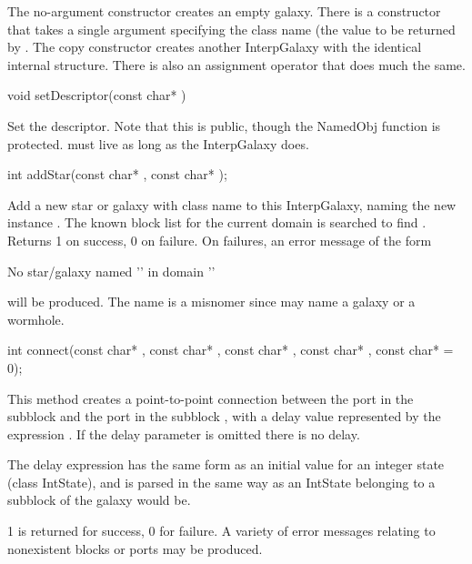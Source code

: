 The no-argument constructor creates an empty galaxy.  There is a
constructor that takes a single  argument
specifying the class name (the value to be returned by .
The copy constructor creates another InterpGalaxy with the identical
internal structure.  There is also an assignment operator that does
much the same.

\begin{example}
void setDescriptor(const char* )
\end{example}

Set the descriptor.  Note that this is public, though the NamedObj
function is protected.  must live as long as the InterpGalaxy
does.

\begin{example}
int addStar(const char* , const char* );
\end{example}

Add a new star or galaxy with class name  to this
InterpGalaxy, naming the new instance .  The known block
list for the current domain is searched to find .
Returns 1 on success, 0 on failure.  On failures, an error message
of the form

\begin{example}
No star/galaxy named '' in domain ''
\end{example}

will be produced.  The name is a misnomer since  may
name a galaxy or a wormhole.

\begin{example}
int connect(const char* , const char* ,
            const char* , const char* ,
            const char*  = 0);
\end{example}

This method creates a point-to-point connection between the port
 in the subblock  and the port 
in the subblock , with a delay value represented by
the expression .
If the delay parameter is omitted there is no delay.

The delay expression has the same form as an initial value for an
integer state (class IntState), and is parsed in the same way as
an IntState belonging to a subblock of the galaxy would be.

1 is returned for success, 0 for failure.
A variety of error messages relating to nonexistent blocks or ports
may be produced.

